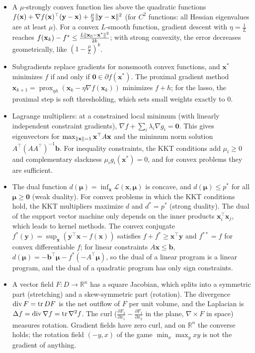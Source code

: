 \begin{itemize}[leftmargin=*]
    \item A $\mu$-strongly convex function lies above the quadratic functions $f(\mathbf{x}) + \nabla f(\mathbf{x})^\top(\mathbf{y} - \mathbf{x}) + \frac{\mu}{2}\lVert \mathbf{y} - \mathbf{x} \rVert^2$ (for $C^2$ functions: all Hessian eigenvalues are at least $\mu$). For a convex $L$-smooth function, gradient descent with $\eta = \frac{1}{L}$ reaches $f(\mathbf{x}_k) - f^* \leq \frac{L\lVert \mathbf{x}_0 - \mathbf{x}^* \rVert^2}{2k}$; with strong convexity, the error decreases geometrically, like $(1 - \frac{\mu}{L})^k$.
    \item Subgradients replace gradients for nonsmooth convex functions, and $\mathbf{x}^*$ minimizes $f$ if and only if $\mathbf{0} \in \partial f(\mathbf{x}^*)$. The proximal gradient method $\mathbf{x}_{k+1} = \operatorname{prox}_{\eta h}(\mathbf{x}_k - \eta\nabla f(\mathbf{x}_k))$ minimizes $f + h$; for the lasso, the proximal step is soft thresholding, which sets small weights exactly to $0$.
    \item Lagrange multipliers: at a constrained local minimum (with linearly independent constraint gradients), $\nabla f + \sum_i \lambda_i\nabla g_i = \mathbf{0}$. This gives eigenvectors for $\max_{\lVert \mathbf{x} \rVert = 1}\mathbf{x}^\top A\mathbf{x}$ and the minimum norm solution $A^\top(AA^\top)^{-1}\mathbf{b}$. For inequality constraints, the KKT conditions add $\mu_i \geq 0$ and complementary slackness $\mu_i g_i(\mathbf{x}^*) = 0$, and for convex problems they are sufficient.
    \item The dual function $d(\boldsymbol{\mu}) = \inf_{\mathbf{x}} \mathcal{L}(\mathbf{x}, \boldsymbol{\mu})$ is concave, and $d(\boldsymbol{\mu}) \leq p^*$ for all $\boldsymbol{\mu} \geq \mathbf{0}$ (weak duality). For convex problems in which the KKT conditions hold, the KKT multipliers maximize $d$ and $d^* = p^*$ (strong duality). The dual of the support vector machine only depends on the inner products $\mathbf{x}_i^\top\mathbf{x}_j$, which leads to kernel methods. The convex conjugate $f^*(\mathbf{y}) = \sup_{\mathbf{x}}(\mathbf{y}^\top\mathbf{x} - f(\mathbf{x}))$ satisfies $f + f^* \geq \mathbf{x}^\top\mathbf{y}$ and $f^{**} = f$ for convex differentiable $f$; for linear constraints $A\mathbf{x} \leq \mathbf{b}$, $d(\boldsymbol{\mu}) = -\mathbf{b}^\top\boldsymbol{\mu} - f^*(-A^\top\boldsymbol{\mu})$, so the dual of a linear program is a linear program, and the dual of a quadratic program has only sign constraints.
    \item A vector field $F: D \to \mathbb{R}^n$ has a square Jacobian, which splits into a symmetric part (stretching) and a skew-symmetric part (rotation). The divergence $\operatorname{div} F = \operatorname{tr} DF$ is the net outflow of $F$ per unit volume, and the Laplacian is $\Delta f = \operatorname{div}\nabla f = \operatorname{tr}\nabla^2 f$. The curl ($\frac{\partial F_2}{\partial x_1} - \frac{\partial F_1}{\partial x_2}$ in the plane, $\nabla \times F$ in space) measures rotation. Gradient fields have zero curl, and on $\mathbb{R}^n$ the converse holds; the rotation field $(-y, x)$ of the game $\min_x\max_y xy$ is not the gradient of anything.

\end{itemize}
